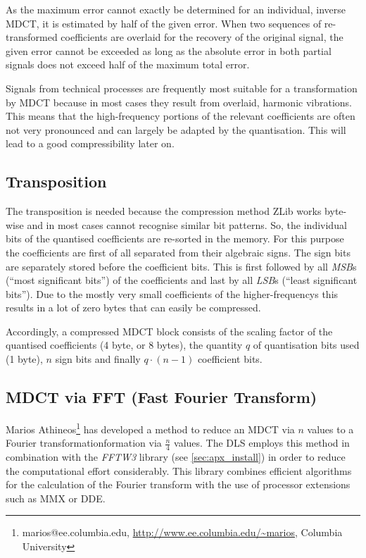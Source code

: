 \documentclass[a4paper,12pt,BCOR6mm,bibtotoc,idxtotoc]{scrbook}
\begin{document}
As the maximum error cannot exactly be determined for an individual, inverse MDCT, it is estimated by half of the given error. When two sequences of re-transformed coefficients are overlaid for the recovery of the original signal, the given error cannot be exceeded as long as the absolute error in both partial signals does not exceed half of the maximum total error.

Signals from technical processes are frequently most suitable for a transformation by MDCT because in most cases they result from overlaid, harmonic vibrations. This means that the high-frequency portions of the relevant coefficients are often not very pronounced and can largely be adapted by the quantisation. This will lead to a good compressibility later on.

\subsection{Transposition} \label{sec:comp_mdct_trans}

The transposition is needed because the compression method ZLib works byte-wise and in most cases cannot recognise similar bit patterns. So, the individual bits of the quantised coefficients are re-sorted in the memory. For this purpose the coefficients are first of all separated from their algebraic signs. The sign bits are separately stored before the coefficient bits. This is first followed by all \textit{MSB}s (``most significant bits'') of the coefficients and last by all \textit{LSB}s (``least significant bits''). Due to the mostly very small coefficients of the higher-frequencys this results in a lot of zero bytes that can easily be compressed.

Accordingly, a compressed MDCT block consists of the scaling factor of the quantised coefficients (4 byte, or 8 bytes), the quantity $q$ of quantisation bits used (1 byte), $n$ sign bits and finally $q \cdot (n - 1) $ coefficient bits.

\subsection{MDCT via FFT (Fast Fourier Transform)}

Marios Athineos\footnote{marios@ee.columbia.edu,
\url{http://www.ee.columbia.edu/~marios}, Columbia University} has developed a
method to reduce an MDCT via $n$ values to a Fourier transformation\-formation
via $\frac{n}{4}$ values. The DLS employs this method in combination with the
\textit{FFTW3} library (see \autoref{sec:apx_install}) in order to reduce the
computational effort considerably. This library combines efficient algorithms
for the calculation of the Fourier transform with the use of processor
extensions such as MMX or DDE.
\end{document}

